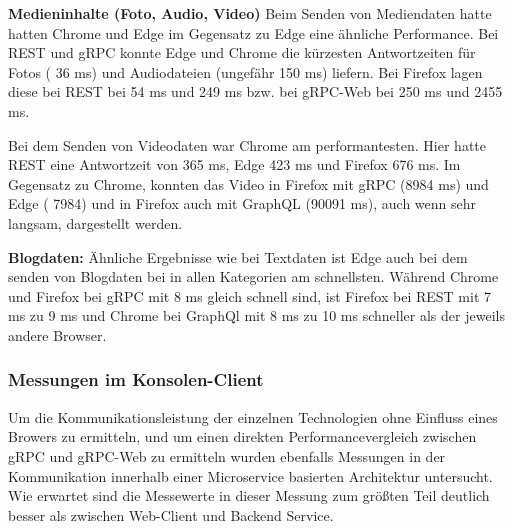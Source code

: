 \textbf{Medieninhalte (Foto, Audio, Video)}  
Beim Senden von Mediendaten hatte hatten Chrome und Edge im Gegensatz zu Edge eine ähnliche Performance. Bei REST und gRPC konnte Edge und Chrome die kürzesten Antwortzeiten für Fotos ( 36 ms) und Audiodateien (ungefähr 150 ms)  liefern. Bei Firefox lagen diese bei REST bei 54 ms und 249 ms bzw. bei gRPC-Web bei 250 ms und 2455 ms.

Bei dem Senden von Videodaten war Chrome am performantesten. Hier hatte REST eine Antwortzeit von 365 ms, Edge 423 ms und Firefox 676 ms. Im Gegensatz zu Chrome, konnten das Video in Firefox mit gRPC (8984 ms) und Edge ( 7984) und in Firefox auch mit GraphQL (90091 ms), auch wenn sehr langsam, dargestellt werden.


\textbf{Blogdaten:}  
Ähnliche Ergebnisse wie bei Textdaten ist Edge auch bei dem senden von Blogdaten bei in allen Kategorien am schnellsten. Während Chrome und Firefox bei gRPC mit 8 ms gleich schnell sind, ist Firefox bei REST mit 7 ms zu 9 ms und Chrome bei GraphQl mit 8 ms zu 10 ms schneller als der jeweils andere Browser.


\clearpage
\subsubsection{Messungen im Konsolen-Client}
Um die Kommunikationsleistung der einzelnen Technologien ohne Einfluss eines Browers zu ermitteln, und um einen direkten Performancevergleich zwischen gRPC und gRPC-Web zu ermitteln wurden ebenfalls Messungen in der Kommunikation innerhalb einer Microservice basierten Architektur untersucht. Wie erwartet sind die Messewerte in dieser Messung zum größten Teil deutlich besser als zwischen Web-Client und Backend Service.  

